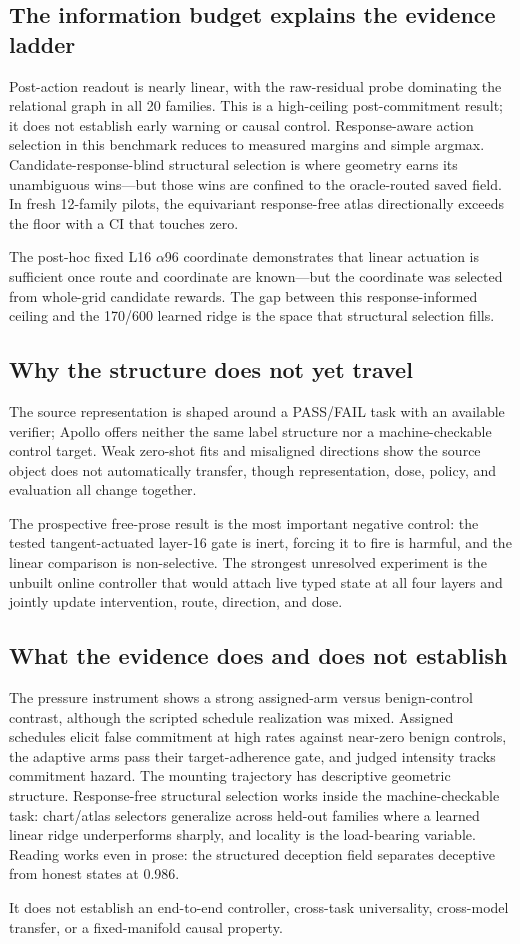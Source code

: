 \subsection{The information budget explains the evidence ladder}

Post-action readout is nearly linear, with the raw-residual probe dominating the relational
graph in all 20 families. This is a high-ceiling post-commitment result; it does not establish
early warning or causal control. Response-aware action selection in this benchmark reduces to
measured margins and simple argmax. Candidate-response-blind structural selection is where
geometry earns its unambiguous wins---but those wins are confined to the oracle-routed saved
field. In fresh 12-family pilots, the equivariant response-free atlas directionally exceeds
the floor with a CI that touches zero.

The post-hoc fixed L16 $\alpha$96 coordinate demonstrates that linear actuation is sufficient
once route and coordinate are known---but the coordinate was selected from whole-grid candidate
rewards. The gap between this response-informed ceiling and the 170/600 learned ridge is the
space that structural selection fills.

\subsection{Why the structure does not yet travel}

The source representation is shaped around a PASS/FAIL task with an available verifier; Apollo
offers neither the same label structure nor a machine-checkable control target. Weak zero-shot
fits and misaligned directions show the source object does not automatically transfer, though
representation, dose, policy, and evaluation all change together.

The prospective free-prose result is the most important negative control: the tested
tangent-actuated layer-16 gate is inert, forcing it to fire is harmful, and the linear
comparison is non-selective. The strongest unresolved experiment is the unbuilt online
controller that would attach live typed state at all four layers and jointly update
intervention, route, direction, and dose.

\subsection{What the evidence does and does not establish}

The pressure instrument shows a strong assigned-arm versus benign-control contrast, although
the scripted schedule realization was mixed. Assigned schedules elicit false commitment at high
rates against near-zero benign controls, the adaptive arms pass their target-adherence gate,
and judged intensity tracks commitment hazard. The mounting trajectory has descriptive
geometric structure. Response-free structural selection works inside the machine-checkable
task: chart/atlas selectors generalize across held-out families where a learned linear ridge
underperforms sharply, and locality is the load-bearing variable. Reading works even in
prose: the structured deception field separates deceptive from honest states at 0.986.

It does not establish an end-to-end controller, cross-task universality, cross-model
transfer, or a fixed-manifold causal property.
